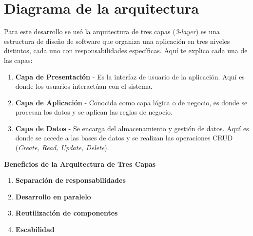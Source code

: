 
\section*{Diagrama de la arquitectura}

Para este desarrollo se usó la arquitectura de tres capas (\textit{3-layer}) es una estructura de diseño de software que organiza una aplicación en tres niveles distintos, cada uno con responsabilidades específicas. Aquí te explico cada una de las capas:

\begin{enumerate}
    \item \textbf{Capa de Presentación} - Es la interfaz de usuario de la aplicación. Aquí es donde los usuarios interactúan con el sistema.
    \item \textbf{Capa de Aplicación} - Conocida como capa lógica o de negocio, es donde se procesan los datos y se aplican las reglas de negocio.
    \item \textbf{Capa de Datos} - Se encarga del almacenamiento y gestión de datos. Aquí es donde se accede a las bases de datos y se realizan las operaciones CRUD (\textit{Create, Read, Update, Delete}).
\end{enumerate}

\newpage
\textbf{Beneficios de la Arquitectura de Tres Capas}

\begin{enumerate}
    \item \textbf{Separación de responsabilidades}
    \item \textbf{Desarrollo en paralelo}
    \item \textbf{Reutilización de componentes}
    \item \textbf{Escabilidad}
\end{enumerate}
